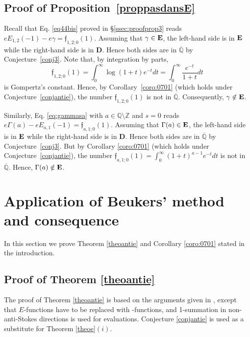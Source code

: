 \documentclass[reqno,12pt]{article}
\numberwithin{equation}{section}
\theoremstyle{remark}
\newcommand{\Qbar}{\overline{\mathbb Q}}
\newcommand{\tantie}{\foreignlanguage{russian}{\CYREREV}}
\newcommand{\antie}{\text{\tantie}}
\newcommand{\EE}{{\bf E}}
\newcommand{\fgo}{\mathfrak{f}}
\begin{document}
\subsection{Proof of Proposition~\ref{proppasdansE}}\label{subsec44}

 Recall that Eq. \eqref{eq44bis} proved in \S \ref{ssec:proofprop3} reads 
$
 eE_{1,2}(-1)- e\gamma=\fgo_{1,2;0}(1).
$
Assuming that $\gamma \in \EE$, the left-hand side is in $\EE$ while the right-hand side is in {\bf D}. Hence both sides are in $\Qbar$ by Conjecture~\ref{conj3}. Note that, by integration by parts,  
$$
\fgo_{1,2;0}(1) =\int_0^\infty \log(1+t)e^{-t}dt = \int_0^{\infty} \frac{e^{-t}}{1+t} dt
$$
is Gompertz's constant. 
Hence, by Corollary~\ref{coro:0701}  (which holds under Conjecture~\ref{conjantie}), the number $\fgo_{1,2;0}(1)$ is not in $\Qbar$. Consequently, $\gamma\notin \EE$.

\medskip

Similarly, Eq.  \eqref{eq:gammasa} with $a\in \mathbb Q\setminus \mathbb Z$ and $s=0$ reads 
$
e\Gamma(a)-eE_{a,1}(-1)=\fgo_{a,1;0}(1).$
Assuming that $\Gamma(a) \in \EE$, the left-hand side is in $\EE$ while the right-hand side is in {\bf D}. Hence both sides are in $\Qbar$ by Conjecture~\ref{conj3}. But by Corollary \ref{coro:0701} (which holds under Conjecture~\ref{conjantie}), the number $\fgo_{a,1;0}(1) = \int_0^\infty  (1+t)^{a-1} e^{-t}dt $ is not in $\Qbar$. Hence, $\Gamma(a)\notin \EE$.

 





\section{Application of Beukers' method and consequence} \label{sec5}

In this section we prove  Theorem \ref{theoantie} and Corollary \ref{coro:0701} stated in the introduction.

\subsection{Proof of Theorem \ref{theoantie}}\label{sec:proofsthm1}

The proof of Theorem \ref{theoantie} is based on the arguments given in \cite{beukers}, except that $E$-functions have to be replaced with \antie-functions, and 1-summation in non-anti-Stokes directions is used for evaluations. Conjecture \ref{conjantie} is used as a substitute for Theorem \ref{theoe}$(i)$.
\end{document}
